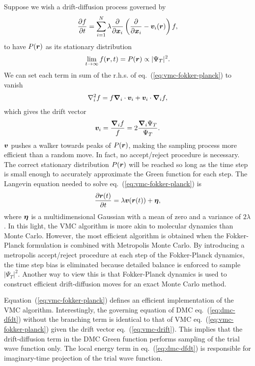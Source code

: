 Suppose we wish a drift-diffusion process governed by
\begin{align} \label{eq:vmc-fokker-planck}
\dfrac{\partial f}{\partial t} = \sum\limits_{i=1}^N \lambda\dfrac{\partial}{\partial\boldsymbol{x}_i}\left(
\dfrac{\partial}{\partial\boldsymbol{x}_i} -\boldsymbol{v}_i(\boldsymbol{r})
\right)f,
\end{align}
to have $P(\boldsymbol{r})$ as its stationary distribution
\begin{align}
\lim\limits_{t\rightarrow\infty} f(\boldsymbol{r},t) = P(\boldsymbol{r}) \propto \vert\Psi_T\vert^2.
\end{align}
We can set each term in sum of the r.h.s. of eq.~(\ref{eq:vmc-fokker-planck}) to vanish
\begin{align}
\nabla_i^2 f = f\boldsymbol{\nabla}_i\cdot\boldsymbol{v}_i + \boldsymbol{v}_i\cdot\boldsymbol{\nabla}_if,
\end{align}
which gives the drift vector
\begin{align} \label{eq:vmc-drift}
\boldsymbol{v}_i = \dfrac{\boldsymbol{\nabla}_if}{f} = 2\dfrac{\boldsymbol{\nabla}_i\Psi_T}{\Psi_T}.
\end{align}
$\boldsymbol{v}$ pushes a walker towards peaks of $P(\boldsymbol{r})$, making the sampling process more efficient than a random move.
In fact, no accept/reject procedure is necessary.
The correct stationary distribution $P(\boldsymbol{r})$ will be reached so long as the time step is small enough to accurately approximate the Green function for each step.
The Langevin equation needed to solve eq.~(\ref{eq:vmc-fokker-planck}) is
\begin{align}
\dfrac{\partial\boldsymbol{r}(t)}{\partial t} = \lambda \boldsymbol{v}(\boldsymbol{r}(t)) + \boldsymbol{\eta},
\end{align}
where $\boldsymbol{\eta}$ is a multidimensional Gaussian with a mean of zero and a variance of $2\lambda$. In this light, the VMC algorithm is more akin to molecular dynamics than Monte Carlo. However, the most efficient algorithm is obtained when the Fokker-Planck formulation is combined with Metropolis Monte Carlo. By introducing a metropolis accept/reject procedure at each step of the Fokker-Planck dynamics, the time step bias is eliminated because detailed balance is enforced to sample $\vert\Psi_T\vert^2$. Another way to view this is that Fokker-Planck dynamics is used to construct efficient drift-diffusion moves for an exact Monte Carlo method.

Equation~(\ref{eq:vmc-fokker-planck}) defines an efficient implementation of the VMC algorithm. Interestingly, the governing equation of DMC eq.~(\ref{eq:dmc-dfdt}) without the branching term is identical to that of VMC eq.~(\ref{eq:vmc-fokker-planck}) given the drift vector eq.~(\ref{eq:vmc-drift}).
This implies that the drift-diffusion term in the DMC Green function performs sampling of the trial wave function only. The local energy term in eq.~(\ref{eq:dmc-dfdt}) is responsible for imaginary-time projection of the trial wave function.

